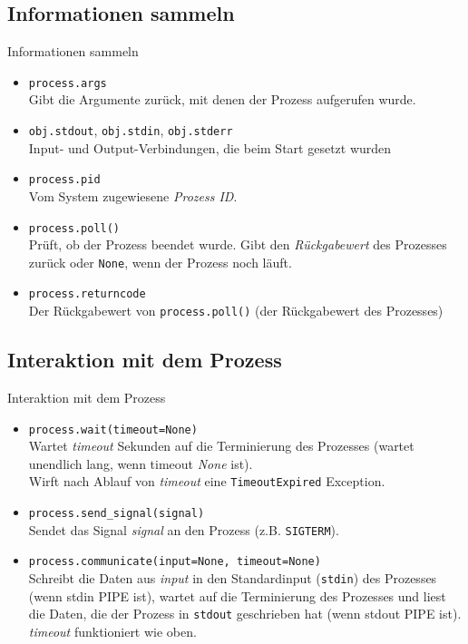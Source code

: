 \subsection{Informationen sammeln}
\begin{frame}[fragile]{Informationen sammeln}
	\begin{itemize}
		\item \texttt{process.args} \\
			Gibt die Argumente zur\"uck, mit denen der Prozess aufgerufen wurde.
		\item \texttt{obj.stdout}, \texttt{obj.stdin}, \texttt{obj.stderr} \\
			Input- und Output-Verbindungen, die beim Start gesetzt wurden
		\item \texttt{process.pid} \\
			Vom System zugewiesene \textit{Prozess ID}.
		\item \texttt{process.poll()} \\
			Pr\"uft, ob der Prozess beendet wurde. Gibt den \textit{R\"uckgabewert}
			des Prozesses zur\"uck oder \texttt{None}, wenn der Prozess noch l\"auft.
		\item \texttt{process.returncode} \\
			Der R\"uckgabewert von \texttt{process.poll()} (der R\"uckgabewert des Prozesses)
	\end{itemize}
\end{frame}

\subsection{Interaktion mit dem Prozess}
\begin{frame}[fragile]{Interaktion mit dem Prozess}
	\begin{itemize}
		\item \texttt{process.wait(timeout=None)} \\
			Wartet \textit{timeout} Sekunden auf die Terminierung des Prozesses
			(wartet unendlich lang, wenn timeout \textit{None} ist). \\
			Wirft nach Ablauf von \textit{timeout} eine \texttt{TimeoutExpired} Exception.
		\item \texttt{process.send\_signal(signal)} \\
			Sendet das Signal \textit{signal} an den Prozess (z.B. \texttt{SIGTERM}).
		\item \texttt{process.communicate(input=None, timeout=None)} \\
			Schreibt die Daten aus \textit{input} in den Standardinput (\texttt{stdin})
			des Prozesses (wenn stdin PIPE ist), wartet auf die Terminierung
			des Prozesses und liest die Daten, die der Prozess in \texttt{stdout}
			geschrieben hat (wenn stdout PIPE ist). \textit{timeout} funktioniert wie oben.
	\end{itemize}
\end{frame}

